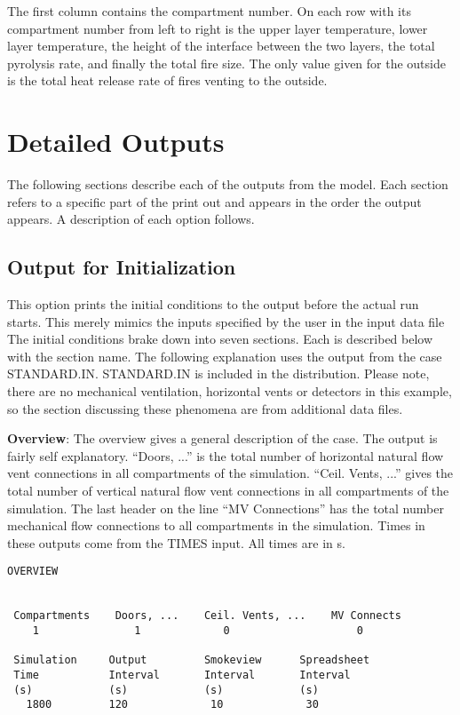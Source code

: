 The first column contains the compartment number.  On each row with its compartment number from left to right is the upper layer temperature, lower layer temperature, the height of the interface between the two layers, the total pyrolysis rate, and finally the total fire size.  The only value given for the outside is the total heat release rate of fires venting to the outside.

\section{Detailed Outputs}

The following sections describe each of the outputs from the model.  Each section refers to a specific part of the print out and appears in the order the output appears. A description of each option follows.

\subsection{Output for Initialization}

This option prints the initial conditions to the output before the actual run starts.  This merely mimics the inputs specified by the user in the input data file  The initial conditions brake down into seven sections.  Each is described below with the section name. The following explanation uses the output from the case STANDARD.IN. STANDARD.IN is included in the distribution. Please note, there are no mechanical ventilation, horizontal vents or detectors in this example, so the section discussing these phenomena are from additional data files.

\textbf{Overview}: The overview gives a general description of the case.  The output is fairly self explanatory. ``Doors, ...'' is the total number of horizontal natural flow vent connections in all compartments of the simulation.  ``Ceil. Vents, ...'' gives the total number of vertical natural flow vent connections in all compartments of the simulation.  The last header on the line ``MV Connections'' has the total number mechanical flow connections to all compartments in the simulation. Times in these outputs come from the TIMES input. All times are in s.

\begin{lstlisting}[basicstyle=\tiny]
 OVERVIEW


 Compartments    Doors, ...    Ceil. Vents, ...    MV Connects
    1               1             0                    0

 Simulation     Output         Smokeview      Spreadsheet
 Time           Interval       Interval       Interval
 (s)            (s)            (s)            (s)
   1800         120             10             30
\end{lstlisting}

